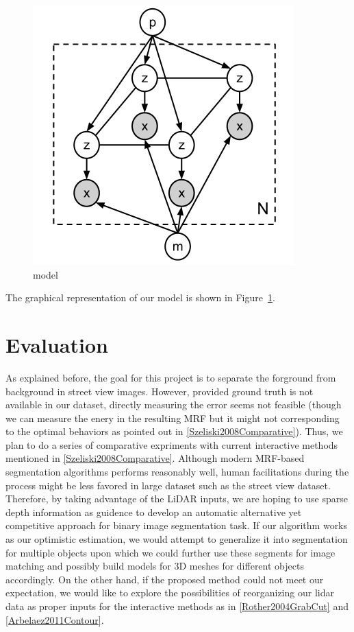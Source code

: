 \documentclass{article} %
\begin{document}
\begin{figure}[ht]
\begin{center}
\includegraphics[height=0.5\linewidth]{./fig/graphical_model.png}
\end{center}
\caption{model}
\label{fig-graphical_model}
\end{figure}

The graphical representation of our model is shown in
Figure~\ref{fig-graphical_model}.



\section{Evaluation}
As explained before, the goal for this project is to separate the forground from background in street view images. However, provided ground truth is not available in our dataset, directly measuring the error seems not feasible (though we can measure the enery in the resulting MRF but it might not corresponding to the optimal behaviors as pointed out in \ref{Szeliski2008Comparative}). Thus, we plan to do a series of comparative expriments with current interactive methods mentioned in \ref{Szeliski2008Comparative}. Although modern MRF-based segmentation algorithms performs reasonably well, human facilitations during the process might be less favored in large dataset such as the street view dataset. Therefore,  by taking advantage of the LiDAR inputs, we are hoping to use sparse depth information as guidence to develop an automatic alternative yet competitive approach for binary image segmentation task. If our algorithm works as our optimistic estimation, we would attempt to generalize it into segmentation for multiple objects upon which we could further use these segments for image matching and possibly build models for 3D meshes for different objects accordingly. On the other hand, if the proposed method could not meet our expectation, we would like to explore the possibilities of reorganizing our lidar data as proper inputs for the interactive methods as in \ref{Rother2004GrabCut} and \ref{Arbelaez2011Contour}.



\end{document}
